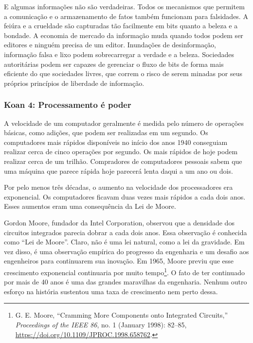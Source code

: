 E algumas informações não são verdadeiras. Todos os mecanismos que permitem a
comunicação e o armazenamento de fatos também funcionam para falsidades. A 
feiúra e a crueldade são capturadas tão facilmente em bits quanto a beleza e a 
bondade. A economia de mercado da informação muda quando todos podem ser 
editores e ninguém precisa de um editor. Inundações de desinformação, informação 
falsa e lixo podem sobrecarregar a verdade e a beleza. Sociedades autoritárias 
podem ser capazes de gerenciar o fluxo de bits de forma mais eficiente do que 
sociedades livres, que correm o risco de serem minadas por seus próprios 
princípios de liberdade de informação.


\subsubsection*{Koan 4: Processamento é poder}

A velocidade de um computador geralmente é medida pelo número de operações 
básicas, como adições, que podem ser realizadas em um segundo. Os computadores 
mais rápidos disponíveis no início dos anos 1940 conseguiam realizar cerca de 
cinco operações por segundo. Os mais rápidos de hoje podem realizar cerca de um 
trilhão. Compradores de computadores pessoais sabem que uma máquina que parece 
rápida hoje parecerá lenta daqui a um ano ou dois.

Por pelo menos três décadas, o aumento na velocidade dos processadores era 
exponencial. Os computadores ficavam duas vezes mais rápidos a cada dois anos. 
Esses aumentos eram uma consequência da Lei de Moore.

\begin{tcolorbox}[title={Lei de Moore}]
Gordon Moore, fundador da Intel Corporation, observou que a densidade dos 
circuitos integrados parecia dobrar a cada dois anos. Essa observação é 
conhecida como ``Lei de Moore''. Claro, não é uma lei natural, como a lei da
gravidade. Em vez disso, é uma observação empírica do progresso da engenharia e 
um desafio aos engenheiros para continuarem sua inovação. Em 1965, Moore previu 
que esse crescimento exponencial continuaria por muito tempo\footnote{G. E.
Moore, ``Cramming More Components onto Integrated Circuits,'' \textit{Proceedings
of the IEEE 86}, no. 1 (January 1998): 82--85, \url{https://doi.org/10.1109/JPROC.1998.658762}.}.
O fato de ter continuado por mais de 40 anos é uma das grandes maravilhas da
engenharia. Nenhum outro esforço na história sustentou uma taxa de crescimento
nem perto dessa.
\end{tcolorbox}


